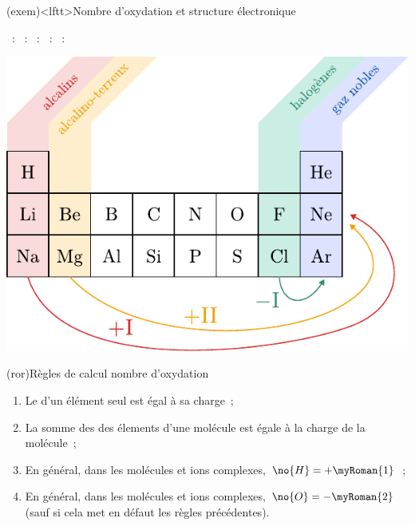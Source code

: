 \documentclass[../../main/main.tex]{subfiles}
\begin{document}
\begin{tcb*}[sidebyside, righthand ratio=.45](exem)<lftt>{Nombre d'oxydation et structure électronique}
	\begin{itemize}
		~: 
		~: 
		~: 
		~: 
		~: 
	\end{itemize}
	\tcblower
	\begin{center}
		\includegraphics[width=\linewidth]{no_tab.pdf}
	\end{center}
\end{tcb*}

\begin{tcb*}(ror){Règles de calcul nombre d'oxydation}
	\begin{enumerate}
		\item Le \no d'un élément seul est égal à sa charge~;
		\item La somme des \no des élements d'une molécule est égale à la charge
		      de la molécule~;
		\item En général, dans les molécules et ions complexes, $\no{H} =
			      +\myRoman{1}$~;
		\item En général, dans les molécules et ions complexes, $\no{O} =
			      -\myRoman{2}$ (sauf si cela met en défaut les règles précédentes).
	\end{enumerate}
\end{tcb*}
\end{document}
